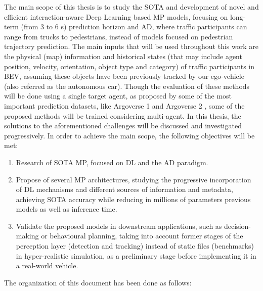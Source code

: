 The main scope of this thesis is to study the \ac{SOTA} and development of novel and efficient interaction-aware Deep Learning based \ac{MP} models, focusing on long-term (from 3 to 6 s) prediction horizon and \ac{AD}, where traffic participants can range from trucks to pedestrians, instead of models focused on pedestrian trajectory prediction. The main inputs that will be used throughout this work are the physical (map) information and historical states (that may include agent position, velocity, orientation, object type and category) of traffic participants in \ac{BEV}, assuming these objects have been previously tracked by our ego-vehicle (also referred as the autonomous car). Though the evaluation of these methods will be done using a single target agent, as proposed by some of the most important prediction datasets, like Argoverse 1 \cite{chang2019argoverse} and Argoverse 2 \cite{wilson2023argoverse}, some of the proposed methods will be trained considering multi-agent. In this thesis, the solutions to the aforementioned challenges will be discussed and investigated progressively. In order to achieve the main scope, the following objectives will be met:

\begin{enumerate}
	\item Research of \ac{SOTA} \ac{MP}, focused on \ac{DL} and the \ac{AD} paradigm.
	\item Propose of several \ac{MP} architectures, studying the progressive incorporation of \ac{DL} mechanisms and different sources of information and metadata, achieving \ac{SOTA} accuracy while reducing in millions of parameters previous models as well as inference time.
	\item Validate the proposed models in downstream applications, such as decision-making or behavioural planning, taking into account former stages of the perception layer (detection and tracking) instead of static files (benchmarks) in hyper-realistic simulation, as a preliminary stage before implementing it in a real-world vehicle.
\end{enumerate}

The organization of this document has been done as follows:

